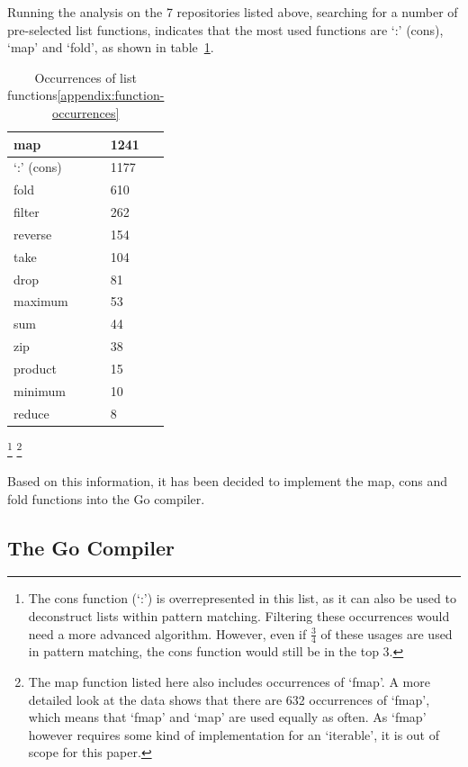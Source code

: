 Running the analysis on the 7 repositories listed above, searching for a number
of pre-selected list functions, indicates that the most used functions are `:'
(cons), `map' and `fold', as shown in table~\ref{tab:occurrences-list-funcs}.

\begin{table}[htb]
\centering
\caption{Occurrences of list functions\ref{appendix:function-occurrences}}\label{tab:occurrences-list-funcs}
\begin{tabular}{ll}
\toprule
map & 1241 \\
\midrule
`:' (cons) & 1177 \\
\midrule
fold & 610 \\
\midrule
filter & 262 \\
\midrule
reverse & 154 \\
\midrule
take & 104 \\
\midrule
drop & 81 \\
\midrule
maximum & 53 \\
\midrule
sum & 44 \\
\midrule
zip & 38 \\
\midrule
product & 15 \\
\midrule
minimum & 10 \\
\midrule
reduce & 8
\end{tabular}
\end{table}
\footnote{The cons function (`:') is overrepresented in this list,
    as it can also be used to deconstruct lists within pattern matching. Filtering
    these occurrences would need a more advanced algorithm. However, even if $\tfrac{3}{4}$
    of these usages are used in pattern matching, the cons function would still be
    in the top 3.
}
\footnote{The map function listed here also includes occurrences of `fmap'. A more
    detailed look at the data shows that there are 632 occurrences of `fmap', which
    means that `fmap' and `map' are used equally as often. As `fmap' however requires
    some kind of implementation for an `iterable', it is out of scope for this paper.
}

Based on this information, it has been decided to implement the map, cons and
fold functions into the Go compiler.

\subsection{The Go Compiler}

